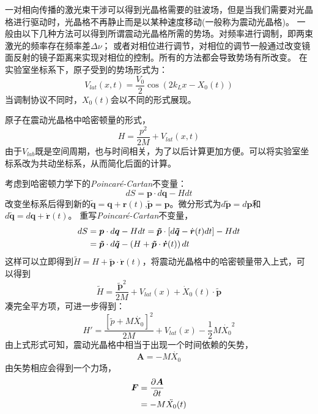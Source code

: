 \documentclass{article}
\begin{document}
	一对相向传播的激光束干涉可以得到光晶格需要的驻波场，但是当我们需要对光晶格进行驱动时，光晶格不再静止而是以某种速度移动(一般称为震动光晶格)。
	一般由以下几种方法可以得到所谓震动光晶格所需的势场。对频率进行调制，即两束激光的频率存在频率差$\Delta \nu$；
	或者对相位进行调节，对相位的调节一般通过改变镜面反射的镜子距离来实现对相位的控制。所有的方法都会导致势场有所改变。
	在实验室坐标系下，原子受到的势场形式为：
	\begin{equation}
		V_{lat}(x,t) = \frac{V_0}{2} \cos (2k_Lx - X_0(t)) 
	\end{equation}	
	当调制协议不同时，$X_0(t)$会以不同的形式展现。

	原子在震动光晶格中哈密顿量的形式，
	\begin{equation}
		H = \frac{p^2}{2M} + V_{lat}(x,t)
	\end{equation}
	由于$V_{lab}$既是空间周期，也与时间相关，为了以后计算更加方便。可以将实验室坐标系改为共动坐标系，从而简化后面的计算。
	
	考虑到哈密顿力学下的\emph{Poincar\'{e}-Cartan}不变量：
	\begin{equation}
		dS = \boldsymbol{p} \cdot d \boldsymbol{q} - Hdt
	\end{equation}
	改变坐标系后得到新的$ \boldsymbol{\tilde{q}} = \boldsymbol{q} + \boldsymbol{r}(t)$,$ \boldsymbol{\tilde{p}} = \boldsymbol{p}$。微分形式为$d \boldsymbol{\tilde{p}} = d \boldsymbol{p}$和$d \boldsymbol{\tilde{q}} = d \boldsymbol{q} + \dot{\boldsymbol{r}} (t)$。
	重写\emph{Poincar\'{e}-Cartan}不变量，
	\begin{align}
		dS &= \boldsymbol{p} \cdot d \boldsymbol{q} - Hdt = \boldsymbol{\tilde{p}} \cdot \left[ d \boldsymbol{\tilde{q}} - \dot{\boldsymbol{r}} (t)dt \right]  - Hdt \notag \\
		&= \boldsymbol{\tilde{p}} \cdot d \boldsymbol{ \tilde{q}} - \left( H + \boldsymbol{\tilde{p}} \cdot \boldsymbol{\dot{r}}(t) \right)dt
	\end{align}
	这样可以立即得到$\tilde{H} = H + \boldsymbol{\tilde{p}} \cdot \boldsymbol{\dot{r}}(t) $，将震动光晶格中的哈密顿量带入上式，可以得到
	\begin{equation}
		\tilde{H} = \frac{\tilde{\boldsymbol{p}}^2}{2M} + V_{lat}(x) + \dot{X}_0(t) \cdot \tilde{\boldsymbol{p}}
	\end{equation}
	凑完全平方项，可进一步得到：
	\begin{equation}
		H' = \frac{\left[ \tilde{p} + M \dot{X_0} \right]^2}{2M} + V_{lat}(x) - \frac{1}{2}M {\dot{X_0}}^2
	\end{equation}
	由上式形式可知，震动光晶格中相当于出现一个时间依赖的矢势，
	\begin{equation}
		\boldsymbol{A} = -M \dot{X_0}
	\end{equation}
	由矢势相应会得到一个力场，
	\begin{align}
		\boldsymbol{F} &= \frac{\partial \boldsymbol{A}}{\partial t} \notag \\
		               &= -M \ddot{X_0}(t)
	\end{align}
	
\end{document}
